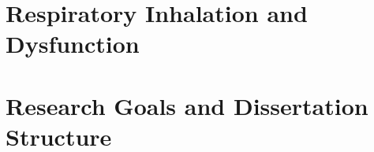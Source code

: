 \section{Respiratory Inhalation and Dysfunction}
\blindtext[2]

\section{Research Goals and Dissertation Structure}
\blindtext[2]

